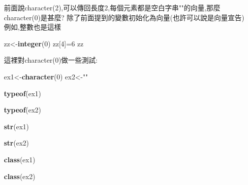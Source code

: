 \documentclass[]{book}
\newenvironment{Shaded}{\begin{snugshade}}{\end{snugshade}}
\newcommand{\DecValTok}[1]{\textcolor[rgb]{0.00,0.00,0.81}{#1}}
\newcommand{\KeywordTok}[1]{\textcolor[rgb]{0.13,0.29,0.53}{\textbf{#1}}}
\newcommand{\NormalTok}[1]{#1}
\newcommand{\StringTok}[1]{\textcolor[rgb]{0.31,0.60,0.02}{#1}}
\theoremstyle{definition}
\theoremstyle{definition}
\theoremstyle{definition}
\theoremstyle{remark}
\begin{document}
前面說character(2),可以傳回長度2,每個元素都是空白字串""的向量,那麼character(0)是甚麼?
除了前面提到的變數初始化為向量(也許可以說是向量宣告) 例如,整數也是這樣

\begin{Shaded}
\begin{Highlighting}[]
\NormalTok{zz<-}\KeywordTok{integer}\NormalTok{(}\DecValTok{0}\NormalTok{)}
\NormalTok{zz[}\DecValTok{4}\NormalTok{]=}\DecValTok{6}
\NormalTok{zz}
\end{Highlighting}
\end{Shaded}

這裡對character(0)做一些測試:

\begin{Shaded}
\begin{Highlighting}[]
\NormalTok{ex1<-}\KeywordTok{character}\NormalTok{(}\DecValTok{0}\NormalTok{) }
\NormalTok{ex2<-}\StringTok{""}

\KeywordTok{typeof}\NormalTok{(ex1)}
\end{Highlighting}
\end{Shaded}

\begin{Shaded}
\begin{Highlighting}[]
\KeywordTok{typeof}\NormalTok{(ex2)}
\end{Highlighting}
\end{Shaded}

\begin{Shaded}
\begin{Highlighting}[]
\KeywordTok{str}\NormalTok{(ex1)}
\end{Highlighting}
\end{Shaded}

\begin{Shaded}
\begin{Highlighting}[]
\KeywordTok{str}\NormalTok{(ex2)}
\end{Highlighting}
\end{Shaded}

\begin{Shaded}
\begin{Highlighting}[]
\KeywordTok{class}\NormalTok{(ex1)}
\end{Highlighting}
\end{Shaded}

\begin{Shaded}
\begin{Highlighting}[]
\KeywordTok{class}\NormalTok{(ex2)}
\end{Highlighting}
\end{Shaded}
\end{document}

